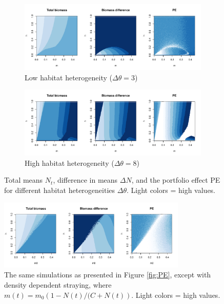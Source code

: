 \documentclass[twocolumn,preprintnumbers,amsmath,amssymb,superscriptaddress]{revtex4}
\begin{document}
\begin{figure}[h!]
  \captionsetup{justification=raggedright,
singlelinecheck=false
}
\centering
\begin{subfigure}[t]{0.55\textwidth}
\centering
\includegraphics[width=\textwidth]{figs2/fig_MDPE_hm_theta3.pdf} 
\caption{Low habitat heterogeneity ($\Delta\theta=3$)} \label{fig:thetadiff1}
\end{subfigure}
\begin{subfigure}[t]{0.55\textwidth}
\centering
\includegraphics[width=\textwidth]{figs2/fig_MDPE_hm_theta8.pdf} 
\caption{High habitat heterogeneity ($\Delta\theta=8$)} \label{fig:thetadiff2}
\end{subfigure}
\caption{Total means $N_t$, difference in means $\Delta N$, and the portfolio effect PE for different habitat heterogeneities $\Delta\theta$. Light colors = high values.
}
\end{figure}


\begin{figure}[h!]
  \captionsetup{justification=raggedright,
singlelinecheck=false
}
\centering
\includegraphics[width=0.8\textwidth]{figs2/fig_MDPE_hm_ddm.pdf}
\caption{
The same simulations as presented in Figure \ref{fig:PE}, except with density dependent straying, where $m(t) = m_0\left(1-N(t)/(C+N(t)\right)$. Light colors = high values.
} \label{fig:ddm}
\end{figure}
\end{document}

